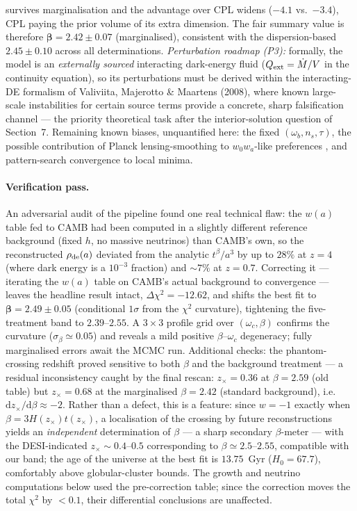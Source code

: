 \documentclass[11pt]{article}
\begin{document}
survives marginalisation and the advantage over CPL widens ($-4.1$ vs.\ $-3.4$), CPL paying the prior volume of its extra dimension. The fair summary value is therefore $\boldsymbol{\beta = 2.42 \pm 0.07}$ (marginalised), consistent with the dispersion-based $2.45 \pm 0.10$ across all determinations. \emph{Perturbation roadmap (P3):} formally, the model is an \emph{externally sourced} interacting dark-energy fluid ($Q_{\rm ext} = \dot M/V$ in the continuity equation), so its perturbations must be derived within the interacting-DE formalism of Valiviita, Majerotto \& Maartens (2008), where known large-scale instabilities for certain source terms provide a concrete, sharp falsification channel --- the priority theoretical task after the interior-solution question of Section~7. Remaining known biases, unquantified here: the fixed $(\omega_b, n_s, \tau)$, the possible contribution of Planck lensing-smoothing to $w_0w_a$-like preferences \cite{Park2025}, and pattern-search convergence to local minima.

\paragraph{Verification pass.} An adversarial audit of the pipeline found one real technical flaw: the $w(a)$ table fed to CAMB had been computed in a slightly different reference background (fixed $h$, no massive neutrinos) than CAMB's own, so the reconstructed $\rho_{\rm de}(a)$ deviated from the analytic $t^{\beta}/a^{3}$ by up to $28\%$ at $z=4$ (where dark energy is a $10^{-3}$ fraction) and $\sim7\%$ at $z=0.7$. Correcting it --- iterating the $w(a)$ table on CAMB's actual background to convergence --- leaves the headline result intact, $\Delta\chi^2 = -12.62$, and shifts the best fit to $\boldsymbol{\beta = 2.49 \pm 0.05}$ (conditional $1\sigma$ from the $\chi^2$ curvature), tightening the five-treatment band to $2.39$--$2.55$. A $3\times3$ profile grid over $(\omega_c, \beta)$ confirms the curvature ($\sigma_\beta \simeq 0.05$) and reveals a mild positive $\beta$--$\omega_c$ degeneracy; fully marginalised errors await the MCMC run. Additional checks: the phantom-crossing redshift proved sensitive to both $\beta$ and the background treatment --- a residual inconsistency caught by the final rescan: $z_\times = 0.36$ at $\beta = 2.59$ (old table) but $z_\times = 0.68$ at the marginalised $\beta = 2.42$ (standard background), i.e.\ $\mathrm{d}z_\times/\mathrm{d}\beta \approx -2$. Rather than a defect, this is a feature: since $w = -1$ exactly when $\beta = 3H(z_\times)t(z_\times)$, a localisation of the crossing by future reconstructions yields an \emph{independent} determination of $\beta$ --- a sharp secondary $\beta$-meter --- with the DESI-indicated $z_\times \sim 0.4$--$0.5$ corresponding to $\beta \simeq 2.5$--$2.55$, compatible with our band; the age of the universe at the best fit is $13.75$~Gyr ($H_0 = 67.7$), comfortably above globular-cluster bounds. The growth and neutrino computations below used the pre-correction table; since the correction moves the total $\chi^2$ by $<0.1$, their differential conclusions are unaffected.
\end{document}
